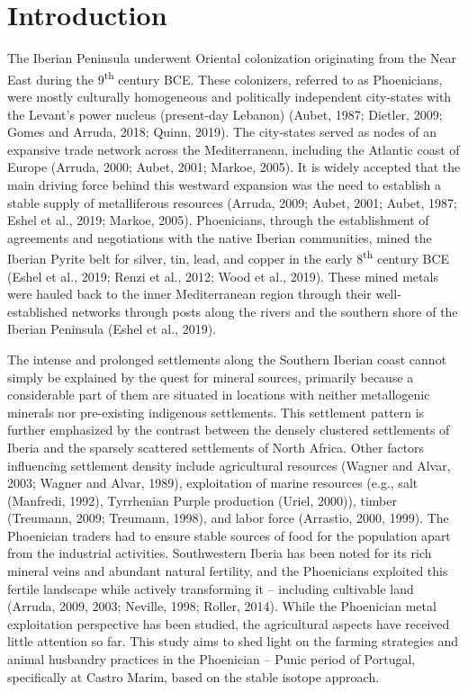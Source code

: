 \documentclass[review]{elsarticle} %
\begin{document}
\hypertarget{introduction}{%
\section{Introduction}\label{introduction}}

The Iberian Peninsula underwent Oriental colonization originating from the Near East during the 9\textsuperscript{th} century BCE. These colonizers, referred to as Phoenicians, were mostly culturally homogeneous and politically independent city-states with the Levant's power nucleus (present-day Lebanon) (Aubet, 1987; Dietler, 2009; Gomes and Arruda, 2018; Quinn, 2019). The city-states served as nodes of an expansive trade network across the Mediterranean, including the Atlantic coast of Europe (Arruda, 2000; Aubet, 2001; Markoe, 2005). It is widely accepted that the main driving force behind this westward expansion was the need to establish a stable supply of metalliferous resources (Arruda, 2009; Aubet, 2001; Aubet, 1987; Eshel et al., 2019; Markoe, 2005). Phoenicians, through the establishment of agreements and negotiations with the native Iberian communities, mined the Iberian Pyrite belt for silver, tin, lead, and copper in the early 8\textsuperscript{th} century BCE (Eshel et al., 2019; Renzi et al., 2012; Wood et al., 2019). These mined metals were hauled back to the inner Mediterranean region through their well-established networks through posts along the rivers and the southern shore of the Iberian Peninsula (Eshel et al., 2019).

The intense and prolonged settlements along the Southern Iberian coast cannot simply be explained by the quest for mineral sources, primarily because a considerable part of them are situated in locations with neither metallogenic minerals nor pre-existing indigenous settlements. This settlement pattern is further emphasized by the contrast between the densely clustered settlements of Iberia and the sparsely scattered settlements of North Africa. Other factors influencing settlement density include agricultural resources (Wagner and Alvar, 2003; Wagner and Alvar, 1989), exploitation of marine resources (e.g., salt (Manfredi, 1992), Tyrrhenian Purple production (Uriel, 2000)), timber (Treumann, 2009; Treumann, 1998), and labor force (Arrastio, 2000, 1999). The Phoenician traders had to ensure stable sources of food for the population apart from the industrial activities. Southwestern Iberia has been noted for its rich mineral veins and abundant natural fertility, and the Phoenicians exploited this fertile landscape while actively transforming it -- including cultivable land (Arruda, 2009, 2003; Neville, 1998; Roller, 2014). While the Phoenician metal exploitation perspective has been studied, the agricultural aspects have received little attention so far. This study aims to shed light on the farming strategies and animal husbandry practices in the Phoenician -- Punic period of Portugal, specifically at Castro Marim, based on the stable isotope approach.
\end{document}
